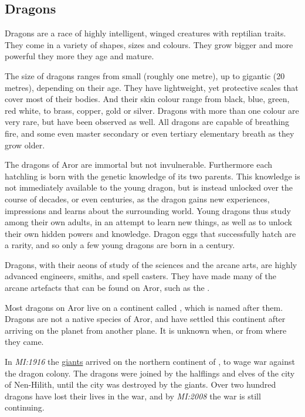 \subsection{Dragons}
\label{sec:Dragons}

Dragons are a race of highly intelligent, winged creatures with reptilian
traits. They come in a variety of shapes, sizes and colours. They grow bigger
and more powerful they more they age and mature.

The size of dragons ranges from small (roughly one metre), up to gigantic (20
metres), depending on their age. They have lightweight, yet protective scales
that cover most of their bodies. And their skin colour range from black, blue,
green, red white, to brass, copper, gold or silver. Dragons with more than
one colour are very rare, but have been observed as well. All dragons are
capable of breathing fire, and some even master secondary or even tertiary
elementary breath as they grow older.

The dragons of Aror are immortal but not invulnerable. Furthermore each
hatchling is born with the genetic knowledge of its two parents. This knowledge
is not immediately available to the young dragon, but is instead unlocked
over the course of decades, or even centuries, as the dragon gains new
experiences, impressions and learns about the surrounding world. Young dragons
thus study among their own adults, in an attempt to learn new things, as well as
to unlock their own hidden powers and knowledge. Dragon eggs that successfully
hatch are a rarity, and so only a few young dragons are born in a century.

Dragons, with their aeons of study of the sciences and the arcane arts, are
highly advanced engineers, smiths, and spell casters. They have made many of
the arcane artefacts that can be found on Aror, such as the
.

Most dragons on Aror live on a continent called , which
is named after them. Dragons are not a native species of Aror, and have settled
this continent after arriving on the planet from another plane. It is unknown
when, or from where they came.

In \emph{MI:1916} the \hyperref[sec:Giants]{giants} arrived on the northern
continent of , to wage war against the dragon colony. The
dragons were joined by the halflings and elves of the city of Nen-Hilith,
until the city was destroyed by the giants. Over two hundred dragons have lost
their lives in the war, and by \emph{MI:2008} the war is still continuing.

